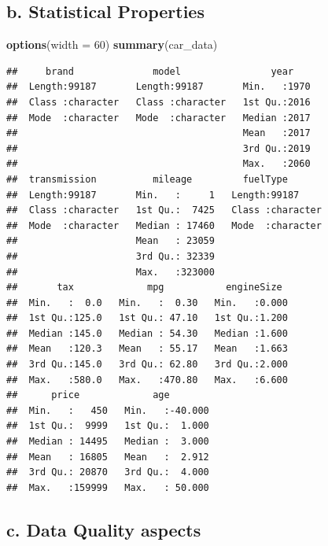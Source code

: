 \documentclass[sigchi]{acmart}
\newenvironment{Shaded}{\begin{snugshade}}{\end{snugshade}}
\newcommand{\DataTypeTok}[1]{\textcolor[rgb]{0.13,0.29,0.53}{#1}}
\newcommand{\DecValTok}[1]{\textcolor[rgb]{0.00,0.00,0.81}{#1}}
\newcommand{\KeywordTok}[1]{\textcolor[rgb]{0.13,0.29,0.53}{\textbf{#1}}}
\newcommand{\NormalTok}[1]{#1}
\begin{document}
\hypertarget{b.-statistical-properties}{%
\subsection{b. Statistical Properties}\label{b.-statistical-properties}}

\begin{Shaded}
\begin{Highlighting}[]
\KeywordTok{options}\NormalTok{(}\DataTypeTok{width =} \DecValTok{60}\NormalTok{)}
\KeywordTok{summary}\NormalTok{(car_data)}
\end{Highlighting}
\end{Shaded}

\begin{verbatim}
##     brand              model                year     
##  Length:99187       Length:99187       Min.   :1970  
##  Class :character   Class :character   1st Qu.:2016  
##  Mode  :character   Mode  :character   Median :2017  
##                                        Mean   :2017  
##                                        3rd Qu.:2019  
##                                        Max.   :2060  
##  transmission          mileage         fuelType        
##  Length:99187       Min.   :     1   Length:99187      
##  Class :character   1st Qu.:  7425   Class :character  
##  Mode  :character   Median : 17460   Mode  :character  
##                     Mean   : 23059                     
##                     3rd Qu.: 32339                     
##                     Max.   :323000                     
##       tax             mpg           engineSize   
##  Min.   :  0.0   Min.   :  0.30   Min.   :0.000  
##  1st Qu.:125.0   1st Qu.: 47.10   1st Qu.:1.200  
##  Median :145.0   Median : 54.30   Median :1.600  
##  Mean   :120.3   Mean   : 55.17   Mean   :1.663  
##  3rd Qu.:145.0   3rd Qu.: 62.80   3rd Qu.:2.000  
##  Max.   :580.0   Max.   :470.80   Max.   :6.600  
##      price             age         
##  Min.   :   450   Min.   :-40.000  
##  1st Qu.:  9999   1st Qu.:  1.000  
##  Median : 14495   Median :  3.000  
##  Mean   : 16805   Mean   :  2.912  
##  3rd Qu.: 20870   3rd Qu.:  4.000  
##  Max.   :159999   Max.   : 50.000
\end{verbatim}

\hypertarget{c.-data-quality-aspects}{%
\subsection{c. Data Quality aspects}\label{c.-data-quality-aspects}}
\end{document}
